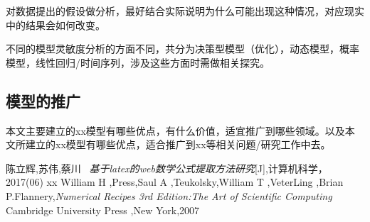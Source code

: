 \documentclass{ctexart}
\begin{document}
对数据提出的假设做分析，最好结合实际说明为什么可能出现这种情况，对应现实中的结果会如何改变。

不同的模型灵敏度分析的方面不同，共分为决策型模型（优化），动态模型，概率模型，线性回归/时间序列，涉及这些方面时需做相关探究。

\subsection{模型的推广}

本文主要建立的xx模型有哪些优点，有什么价值，适宜推广到哪些领域。以及本文所建立的xx模型有哪些优点，适合推广到xx等相关问题/研究工作中去。

\begin{thebibliography}{100}%
     陈立辉,苏伟,蔡川  \emph{基于latex的web数学公式提取方法研究}[J],计算机科学，2017(06)
     xx
    William H ,Press,Saul A ,Teukolsky,William T ,VeterLing ,Brian P.Flannery,\emph{Numerical Recipes 3rd Edition:The Art of Scientific Computing }Cambridge University Press ,New York,2007    
\end{thebibliography}
\newpage
\end{document}
